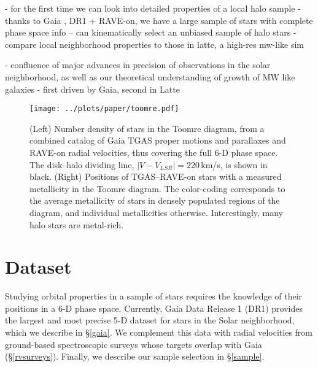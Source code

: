 \documentclass[apj, twocolappendix, numberedappendix, appendixfloats]{emulateapj}
\begin{document}
- for the first time we can look into detailed properties of a local halo sample
- thanks to Gaia \citep{perryman2001}, DR1 + RAVE-on, we have a large sample of stars with complete phase space info -- can kinematically select an unbiased sample of halo stars
- compare local neighborhood properties to those in latte, a high-res mw-like sim

- confluence of major advances in precision of observations in the solar neighborhood, as well as our theoretical understanding of growth of MW like galaxies
- first driven by Gaia, second in Latte


\begin{figure*}
\begin{center}
\texttt{[image: ../plots/paper/toomre.pdf]}
\caption{(Left) Number density of stars in the Toomre diagram, from a combined catalog of Gaia TGAS proper motions and parallaxes and RAVE-on radial velocities, thus covering the full 6-D phase space.
The disk--halo dividing line, $|V-V_{LSR}|=220$\,km/s, is shown in black.
(Right) Positions of TGAS--RAVE-on stars with a measured metallicity in the Toomre diagram.
The color-coding corresponds to the average metallicity of stars in densely populated regions of the diagram, and individual metallicities otherwise.
Interestingly, many halo stars are metal-rich.}
\label{fig:toomre}
\end{center}
\end{figure*}


\section{Dataset}
Studying orbital properties in a sample of stars requires the knowledge of their positions in a 6-D phase space.
Currently, Gaia Data Release 1 (DR1) provides the largest and most precise 5-D dataset for stars in the Solar neighborhood, which we describe in \S\ref{gaia}.
We complement this data with radial velocities from ground-based spectroscopic surveys whose targets overlap with Gaia (\S\ref{rvsurveys}).
Finally, we describe our sample selection in \S\ref{sample}.
\end{document}
